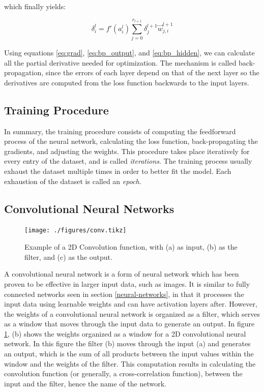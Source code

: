 \documentclass[12pt,a4paper,]{report}
\begin{document}
which finally yields:

\begin{equation}
\delta^l_i = f'(a^{l}_i) \sum_{j=0}^{r_{l+1}} \delta^{l+1}_j \vec{w}^{l+1}_{j, i}  \label{eq:bp_hidden}
\end{equation}

Using equations \ref{eq:grad}, \ref{eq:bp_output}, and
\ref{eq:bp_hidden}, we can calculate all the partial derivative needed
for optimization. The mechanism is called back-propagation, since the
errors of each layer depend on that of the next layer so the derivatives
are computed from the loss function backwards to the input layers.

\hypertarget{training-procedure}{%
\subsection{Training Procedure}\label{training-procedure}}

In summary, the training procedure consists of computing the feedforward
process of the neural network, calculating the loss function,
back-propagating the gradients, and adjusting the weights. This
procedure takes place iteratively for every entry of the dataset, and is
called \emph{iterations}. The training process usually exhaust the
dataset multiple times in order to better fit the model. Each exhaustion
of the dataset is called an \emph{epoch}.

\hypertarget{convolutional-neural-networks}{%
\subsection{Convolutional Neural
Networks}\label{convolutional-neural-networks}}

\begin{figure}[h]
    \texttt{[image: ./figures/conv.tikz]}
    \centering
    \caption{Example of a 2D Convolution function, with (a) as input, (b) as the filter, and (c) as the output.} \label{fig:conv}
\end{figure}

A convolutional neural network is a form of neural network which has
been proven to be effective in larger input data, such as images. It is
similar to fully connected networks seen in section
\ref{neural-networks}, in that it processes the input data using
learnable weights and can have activation layers after. However, the
weights of a convolutional neural network is organized as a filter,
which serves as a window that moves through the input data to generate
an output. In figure \ref{fig:conv}, (b) shows the weights organized as
a window for a 2D convolutional neural network. In this figure the
filter (b) moves through the input (a) and generates an output, which is
the sum of all products between the input values within the window and
the weights of the filter. This computation results in calculating the
convolution function (or generally, a cross-correlation function),
between the input and the filter, hence the name of the network.
\end{document}
